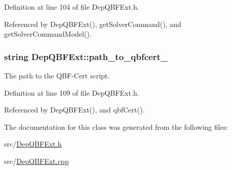 Definition at line 104 of file Dep\-Q\-B\-F\-Ext.\-h.



Referenced by Dep\-Q\-B\-F\-Ext(), get\-Solver\-Command(), and get\-Solver\-Command\-Model().

\hypertarget{classDepQBFExt_a05676410e9b70c5e83cb13b708e2f178}{
\subsubsection[{path\-\_\-to\-\_\-qbfcert\-\_\-}]{\setlength{\rightskip}{0pt plus 5cm}string Dep\-Q\-B\-F\-Ext\-::path\-\_\-to\-\_\-qbfcert\-\_\-\hspace{0.3cm}{\ttfamily [protected]}}}\label{classDepQBFExt_a05676410e9b70c5e83cb13b708e2f178}


The path to the Q\-B\-F-\/\-Cert script. 



Definition at line 109 of file Dep\-Q\-B\-F\-Ext.\-h.



Referenced by Dep\-Q\-B\-F\-Ext(), and qbf\-Cert().



The documentation for this class was generated from the following files\-:\begin{DoxyCompactItemize}
\item 
src/\hyperlink{DepQBFExt_8h}{Dep\-Q\-B\-F\-Ext.\-h}\item 
src/\hyperlink{DepQBFExt_8cpp}{Dep\-Q\-B\-F\-Ext.\-cpp}\end{DoxyCompactItemize}
